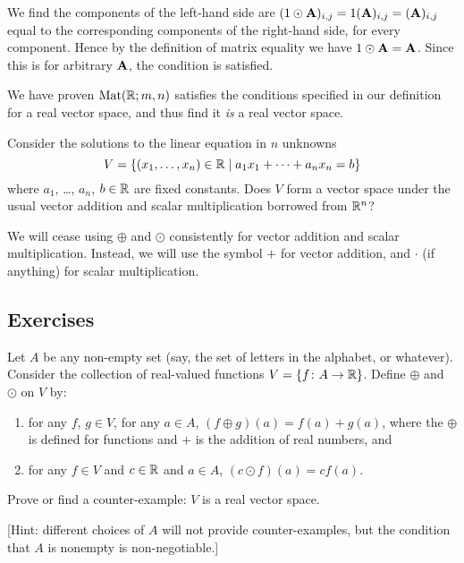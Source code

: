 \begin{example}
\begin{enumerate}[label=(\arabic*)]
  We find the components of the left-hand side are
  $(1\odot\mathbf{A})_{i,j} = 1(\mathbf{A})_{i,j} = (\mathbf{A})_{i,j}$ equal to
  the corresponding components of the right-hand side, for every
  component. Hence by the definition of matrix equality we have
  $1\odot\mathbf{A}=\mathbf{A}$.
  Since this is for arbitrary $\mathbf{A}$, the condition is satisfied.
\end{enumerate}
We have proven $\mathrm{Mat}(\mathbb{R};m,n)$ satisfies the conditions specified in our
definition for a real vector space, and thus find it \emph{is} a real
vector space.
\end{example}

\label{puzzle:vector-spaces:solution-space}
Consider the solutions to the linear equation in $n$ unknowns
\begin{equation}
V = \{(x_{1},\dots,x_{n})\in\mathbb{R}\mid a_{1}x_{1}+\cdots+a_{n}x_{n}=b\}
\end{equation}
where $a_{1}$, \dots, $a_{n}$, $b\in\mathbb{R}$ are fixed constants.
Does $V$ form a vector space under the usual vector addition and scalar
multiplication borrowed from $\mathbb{R}^{n}$?

We will cease using $\oplus$ and $\odot$ consistently for vector
addition and scalar multiplication. Instead, we will use the symbol $+$
for vector addition, and $\cdot$ (if anything) for scalar multiplication.

\subsection*{Exercises}

\begin{exercise}
Let $A$ be any non-empty set (say, the set of letters in the alphabet,
or whatever). Consider the collection of real-valued functions
$V=\{f\colon A\to\mathbb{R}\}$. Define $\oplus$ and $\odot$ on $V$ by:
\begin{enumerate}
\item for any $f$, $g\in V$, for any $a\in A$, $(f\oplus g)(a) = f(a) + g(a)$,
where the $\oplus$ is defined for functions and $+$ is the addition of
real numbers, and
\item for any $f\in V$ and $c\in\mathbb{R}$ and $a\in A$, $(c\odot f)(a)=cf(a)$.
\end{enumerate}
Prove or find a counter-example: $V$ is a real vector space.

[Hint: different choices of $A$ will not provide counter-examples, but
  the condition that $A$ is nonempty is non-negotiable.]
\end{exercise}

